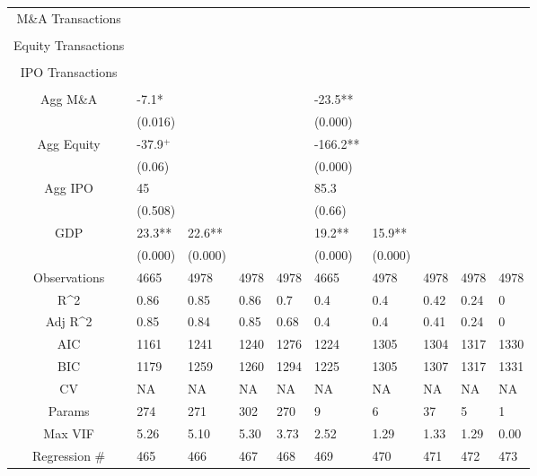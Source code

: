 \documentclass{article}
\begin{document}
\begin{table}[H]
\begin{tabular}{|clllllllll|}
  M\&A Transactions &  &  &  &  &  &  &  &  &  \\
   &  &  &  &  &  &  &  &  &  \\
  Equity Transactions &  &  &  &  &  &  &  &  &  \\
   &  &  &  &  &  &  &  &  &  \\
  IPO Transactions &  &  &  &  &  &  &  &  &  \\
   &  &  &  &  &  &  &  &  &  \\
  Agg M\&A & -7.1* &  &  &  & -23.5** &  &  &  &  \\
   & (0.016) &  &  &  & (0.000) &  &  &  &  \\
  Agg Equity & -37.9$^{+}$ &  &  &  & -166.2** &  &  &  &  \\
   & (0.06) &  &  &  & (0.000) &  &  &  &  \\
  Agg IPO & 45 &  &  &  & 85.3 &  &  &  &  \\
   & (0.508) &  &  &  & (0.66) &  &  &  &  \\
  GDP & 23.3** & 22.6** &  &  & 19.2** & 15.9** &  &  &  \\
   & (0.000) & (0.000) &  &  & (0.000) & (0.000) &  &  &  \\
  \hline
 Observations & 4665 & 4978 & 4978 & 4978 & 4665 & 4978 & 4978 & 4978 & 4978 \\
  R^2 & 0.86 & 0.85 & 0.86 & 0.7 & 0.4 & 0.4 & 0.42 & 0.24 & 0 \\
  Adj R^2 & 0.85 & 0.84 & 0.85 & 0.68 & 0.4 & 0.4 & 0.41 & 0.24 & 0 \\
  AIC & 1161 & 1241 & 1240 & 1276 & 1224 & 1305 & 1304 & 1317 & 1330 \\
  BIC & 1179 & 1259 & 1260 & 1294 & 1225 & 1305 & 1307 & 1317 & 1331 \\
  CV & NA & NA & NA & NA & NA & NA & NA & NA & NA \\
  Params & 274 & 271 & 302 & 270 & 9 & 6 & 37 & 5 & 1 \\
  Max VIF & 5.26 & 5.10 & 5.30 & 3.73 & 2.52 & 1.29 & 1.33 & 1.29 & 0.00 \\
  Regression \# & 465 & 466 & 467 & 468 & 469 & 470 & 471 & 472 & 473 \\
   \hline
\end{tabular}

\end{table}
\end{document}
